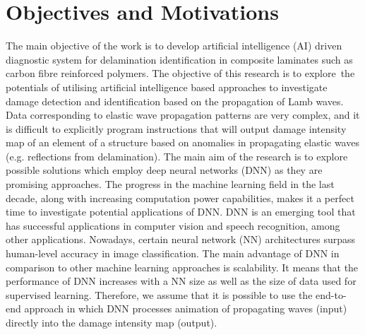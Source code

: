 \section{Objectives and Motivations}
\label{sec13}

The main objective of the work is to develop artificial intelligence (AI) driven diagnostic system for delamination identification in composite laminates such as carbon fibre reinforced polymers. 
The objective of this research is to explore the potentials of utilising artificial intelligence based approaches to investigate damage detection and  identification based on the propagation of Lamb waves.
Data corresponding to elastic wave propagation patterns are very complex, and it is difficult to explicitly program instructions that will output damage intensity map of an element of a structure based on anomalies in propagating elastic waves (e.g. reflections from delamination). 
The main aim of the research is to explore possible solutions which employ deep neural networks (DNN) as they are promising approaches. 
The progress in the machine learning field in the last decade, along with increasing computation power capabilities, makes it a perfect time to investigate potential applications of DNN. 
DNN is an emerging tool that has successful applications in computer vision and speech recognition, among other applications. 
Nowadays, certain neural network (NN) architectures surpass human-level accuracy in image classification. 
The main advantage of DNN in comparison to other machine learning approaches is scalability. 
It means that the performance of DNN increases with a NN size as well as the size of data used for supervised learning. 
Therefore, we assume that it is possible to use the end-to-end approach in which DNN processes animation of propagating waves (input) directly into the damage intensity map (output).

